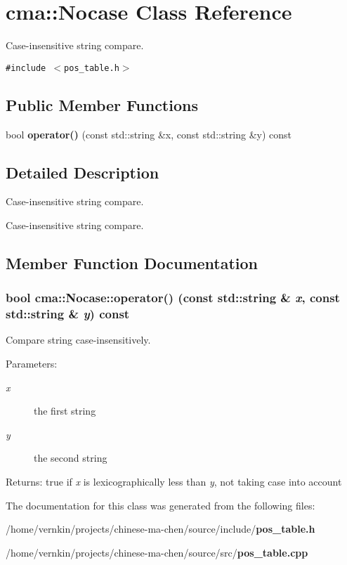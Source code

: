 \section{cma::Nocase Class Reference}
\label{classcma_1_1Nocase}
Case-insensitive string compare.  


{\tt \#include $<$pos\_\-table.h$>$}

\subsection*{Public Member Functions}
\begin{CompactItemize}
\item 
bool {\bf operator()} (const std::string \&x, const std::string \&y) const 
\end{CompactItemize}


\subsection{Detailed Description}
Case-insensitive string compare. 

Case-insensitive string compare. 

\subsection{Member Function Documentation}
\subsubsection[{operator()}]{\setlength{\rightskip}{0pt plus 5cm}bool cma::Nocase::operator() (const std::string \& {\em x}, \/  const std::string \& {\em y}) const}\label{classcma_1_1Nocase_26ede1cd9f2d4ee5796af335019014e1}


Compare string case-insensitively. \begin{Desc}
\item[Parameters:]
\begin{description}
\item[{\em x}]the first string \item[{\em y}]the second string \end{description}
\end{Desc}
\begin{Desc}
\item[Returns:]true if {\em x\/} is lexicographically less than {\em y\/}, not taking case into account \end{Desc}


The documentation for this class was generated from the following files:\begin{CompactItemize}
\item 
/home/vernkin/projects/chinese-ma-chen/source/include/{\bf pos\_\-table.h}\item 
/home/vernkin/projects/chinese-ma-chen/source/src/{\bf pos\_\-table.cpp}\end{CompactItemize}
